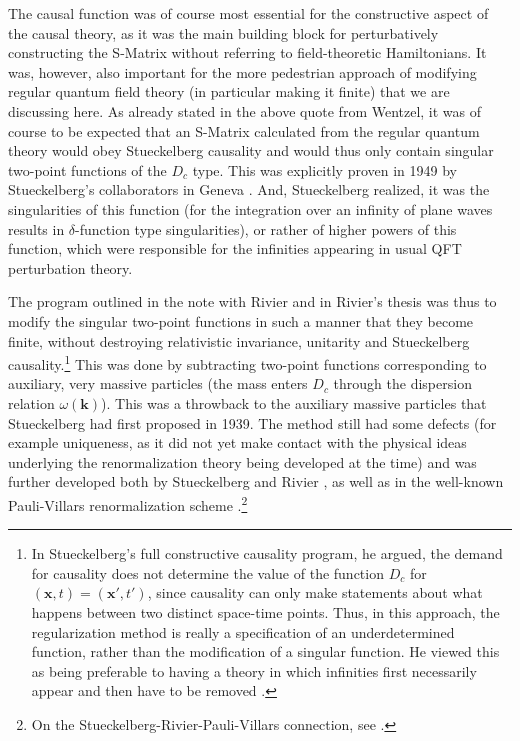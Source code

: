 \documentclass[12pt]{article}
\begin{document}
The causal function was of course most essential for the constructive aspect of the causal theory, as it was the main building block for perturbatively constructing the S-Matrix without referring to field-theoretic Hamiltonians. It was, however, also important for the more pedestrian approach of modifying regular quantum field theory (in particular making it finite) that we are discussing here. As already stated in the above quote from Wentzel, it was of course to be expected that an S-Matrix calculated from the regular quantum theory would obey Stueckelberg causality and would thus only contain singular two-point functions of the $D_c$ type. This was explicitly proven in 1949 by Stueckelberg's collaborators in Geneva \citep{houriet_1949_classification}. And, Stueckelberg realized, it was the singularities of this function (for the integration over an infinity of plane waves results in $\delta$-function type singularities), or rather of higher powers of this function, which were responsible for the infinities appearing in usual QFT perturbation theory.

The program outlined in the note with Rivier and in Rivier's thesis was thus to modify the singular two-point functions in such a manner that they become finite, without destroying relativistic invariance, unitarity and Stueckelberg causality.\footnote{In Stueckelberg's full constructive causality program, he argued, the demand for causality does not determine the value of the function $D_c$ for $(\mathbf{x}, t) = (\mathbf{x}', t')$, since causality can only make statements about what happens between two distinct space-time points. Thus, in this approach, the regularization method is really a specification of an underdetermined function, rather than the modification of a singular function. He viewed this as being preferable to having a theory in which infinities first necessarily appear and then have to be removed \citep{stueckelberg_1950_causalite}.} This was done by subtracting two-point functions corresponding to auxiliary, very massive particles (the mass enters $D_c$ through the dispersion relation $\omega (\mathbf{k})$). This was a throwback to the auxiliary massive particles that Stueckelberg had first proposed in 1939. The method still had some defects (for example uniqueness, as it did not yet make contact with the physical ideas underlying the renormalization theory being developed at the time) and was further developed both by Stueckelberg and Rivier \citep{stueckelberg_1950_a-propos}, as well as in the well-known Pauli-Villars renormalization scheme \citep{pauli_1949_on-the-invariant}.\footnote{On the Stueckelberg-Rivier-Pauli-Villars connection, see \citep[pp. 582ff]{schweber_1994_qed}.}
\end{document}
